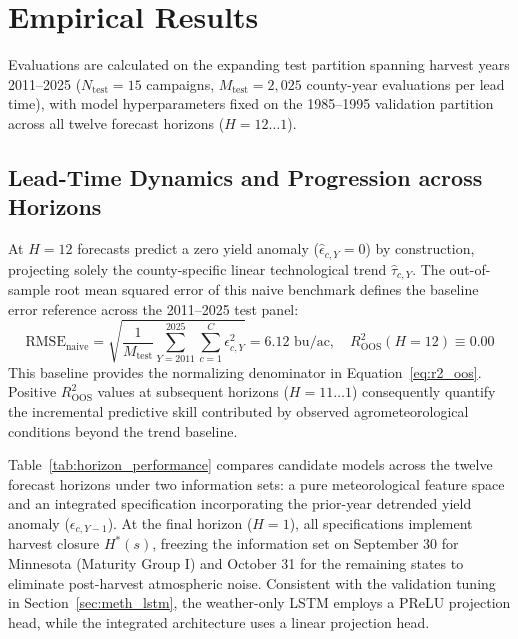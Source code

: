 \chapter{Empirical Results}
\label{chap:empirical_results}

Evaluations are calculated on the expanding test partition spanning harvest years 2011--2025 ($N_{\text{test}} = 15$ campaigns, $M_{\text{test}} = 2{,}025$ county-year evaluations per lead time), with model hyperparameters fixed on the 1985--1995 validation partition across all twelve forecast horizons ($H = 12 \dots 1$).


\section{Lead-Time Dynamics and Progression across Horizons}
\label{sec:res_horizon_progression}

At $H=12$ forecasts predict a zero yield anomaly ($\hat{\epsilon}_{c,Y} = 0$) by construction, projecting solely the county-specific linear technological trend $\hat{\tau}_{c,Y}$. The out-of-sample root mean squared error of this naive benchmark defines the baseline error reference across the 2011--2025 test panel:
\begin{equation}
    \text{RMSE}_{\text{naive}} = \sqrt{\frac{1}{M_{\text{test}}} \sum_{Y=2011}^{2025} \sum_{c=1}^C \epsilon_{c,Y}^2} = 6.12\text{ bu/ac}, \quad R^2_{\text{OOS}}(H=12) \equiv 0.00
    \label{eq:rmse_naive_reference}
\end{equation}
This baseline provides the normalizing denominator in Equation~\eqref{eq:r2_oos}. Positive $R^2_{\text{OOS}}$ values at subsequent horizons ($H = 11 \dots 1$) consequently quantify the incremental predictive skill contributed by observed agrometeorological conditions beyond the trend baseline.

Table~\ref{tab:horizon_performance} compares candidate models across the twelve forecast horizons under two information sets: a pure meteorological feature space and an integrated specification incorporating the prior-year detrended yield anomaly ($\epsilon_{c,Y-1}$). At the final horizon ($H=1$), all specifications implement harvest closure $H^*(s)$, freezing the information set on September 30 for Minnesota (Maturity Group I) and October 31 for the remaining states to eliminate post-harvest atmospheric noise. Consistent with the validation tuning in Section~\ref{sec:meth_lstm}, the weather-only LSTM employs a PReLU projection head, while the integrated architecture uses a linear projection head.

